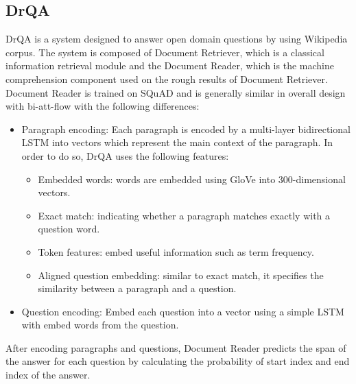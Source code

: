 \documentclass[paper=a4, fontsize=11pt]{scrartcl} %
\begin{document}
\subsection{DrQA}
DrQA is a system designed to answer open domain questions by using Wikipedia corpus. The system is composed of Document Retriever, which is a classical information retrieval module and the Document Reader, which is the machine comprehension component used on the rough results of Document Retriever. Document Reader is trained on SQuAD and is generally similar in overall design with bi-att-flow with the following differences:
\begin{itemize}
	\item Paragraph encoding: Each paragraph is encoded by a multi-layer bidirectional LSTM into vectors which represent the main context of the paragraph. In order to do so, DrQA uses the following features:
	\begin{itemize}
		\item Embedded words: words are embedded using GloVe into 300-dimensional vectors. 
		\item Exact match: indicating whether a paragraph matches exactly with a question word.
		\item Token features: embed useful information such as term frequency.
		\item Aligned question embedding: similar to exact match, it specifies the similarity between a paragraph and a question.
	\end{itemize}
	\item Question encoding: Embed each question into a vector using a simple LSTM with embed words from the question.
\end{itemize}

After encoding paragraphs and questions, Document Reader predicts the span of the answer for each question by calculating the probability of start index and end index of the answer. 
\end{document}
